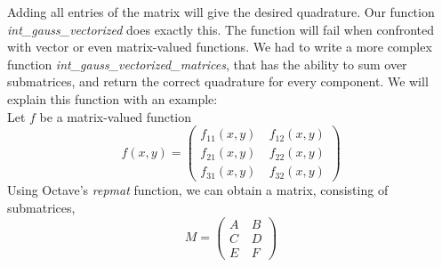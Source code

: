 \documentclass[a4paper,12pt]{article}
\begin{document}
Adding all entries of the matrix will give the desired quadrature. Our function \textit{int\_gauss\_vectorized} does exactly this. The function will fail when confronted with vector or even matrix-valued functions. We had to write a more complex function \textit{int\_gauss\_vectorized\_matrices}, that has the ability to sum over submatrices, and return the correct quadrature for every component. We will explain this function with an example:\\
Let $f$ be a matrix-valued function
\begin{equation}f(x,y)=\begin{pmatrix} f_{1 1}(x,y) &\ f_{1 2}(x,y) \\
						 f_{2 1}(x,y) &\ f_{2 2}(x,y) \\
                         f_{3 1}(x,y) &\ f_{3 2}(x,y) \end{pmatrix}
\end{equation}
Using Octave's \textit{repmat} function, we can obtain a matrix, consisting of submatrices,
\[M=\begin{pmatrix} A &\ B \\
			      C &\ D \\
                  E &\ F \end{pmatrix}\]
\end{document}
